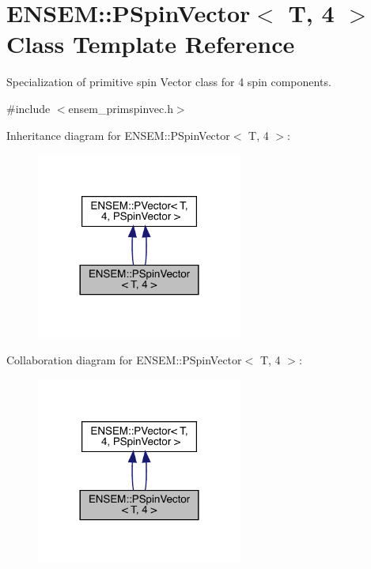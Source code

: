 \hypertarget{classENSEM_1_1PSpinVector_3_01T_00_014_01_4}{}\section{E\+N\+S\+EM\+:\+:P\+Spin\+Vector$<$ T, 4 $>$ Class Template Reference}
\label{classENSEM_1_1PSpinVector_3_01T_00_014_01_4}


Specialization of primitive spin Vector class for 4 spin components.  




{\ttfamily \#include $<$ensem\+\_\+primspinvec.\+h$>$}



Inheritance diagram for E\+N\+S\+EM\+:\+:P\+Spin\+Vector$<$ T, 4 $>$\+:\nopagebreak
\begin{figure}[H]
\begin{center}
\leavevmode
\includegraphics[width=192pt]{d9/d03/classENSEM_1_1PSpinVector_3_01T_00_014_01_4__inherit__graph}
\end{center}
\end{figure}


Collaboration diagram for E\+N\+S\+EM\+:\+:P\+Spin\+Vector$<$ T, 4 $>$\+:\nopagebreak
\begin{figure}[H]
\begin{center}
\leavevmode
\includegraphics[width=192pt]{d5/ddb/classENSEM_1_1PSpinVector_3_01T_00_014_01_4__coll__graph}
\end{center}
\end{figure}
